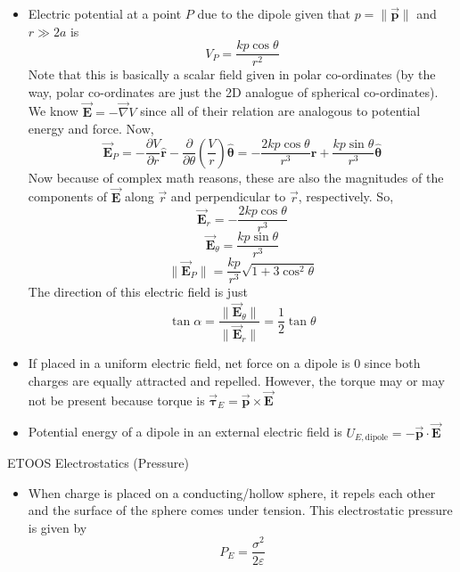 \documentclass{scrartcl}
\begin{document}
    \begin{itemize}
        \item Electric potential at a point $P$ due to the dipole given that $p=\|\vec{\mathbf p}\|$ and $r\gg2a$ is \[\boxed{V_P=\frac{kp\cos\theta}{r^2}}\] Note that this is basically a scalar field given in polar co-ordinates (by the way, polar co-ordinates are just the 2D analogue of spherical co-ordinates). We know $\vec{\mathbf E}=-\vec\nabla V$ since all of their relation are analogous to potential energy and force. Now, \[\vec{\mathbf E}_P=-\frac{\partial V}{\partial r}\hat{\mathbf r}-\frac{\partial}{\partial\theta}\left(\frac Vr\right)\hat{\mathbf{\theta}}=\boxed{-\frac{2kp\cos\theta}{r^3}\hat{\mathbf r}+\frac{kp\sin\theta}{r^3}\hat{\mathbf{\theta}}}\] Now because of complex math reasons, these are also the magnitudes of the components of $\vec{\mathbf E}$ along $\vec r$ and perpendicular to $\vec r$, respectively. So, \[\boxed{\vec{\mathbf E}_r=-\frac{2kp\cos\theta}{r^3}}\]\[\boxed{\vec{\mathbf E}_\theta=\frac{kp\sin\theta}{r^3}}\]\[\boxed{\|\vec{\mathbf E}_P\|=\frac{kp}{r^3}\sqrt{1+3\cos^2\theta}}\] The direction of this electric field is just \[\boxed{\tan\alpha=\frac{\|\vec{\mathbf E}_\theta\|}{\|\vec{\mathbf E}_r\|}=\frac12\tan\theta}\]
        \item If placed in a uniform electric field, net force on a dipole is 0 since both charges are equally attracted and repelled. However, the torque may or may not be present because torque is $\boxed{\vec{\mathbf{\tau}}_E=\vec{\mathbf p}\times\vec{\mathbf E}}$
        \item Potential energy of a dipole in an external electric field is $\boxed{U_{E,\text{dipole}}=-\vec{\mathbf p}\cdot\vec{\mathbf E}}$
    \end{itemize}
    ETOOS Electrostatics (Pressure)
    \begin{itemize}
        \item When charge is placed on a conducting/hollow sphere, it repels each other and the surface of the sphere comes under tension. This electrostatic pressure is given by \[\boxed{P_E=\frac{\sigma^2}{2\varepsilon}}\]
    \end{itemize}
\end{document}
